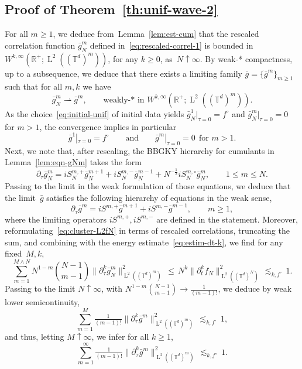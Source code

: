 \documentclass[a4paper,11pt,reqno,noindent]{amsart}
\theoremstyle{plain}
\numberwithin{equation}{section}
\newcommand{\R}{\mathbb R}
\newcommand{\T}{\mathbb T}
\newcommand{\3}{|\!|\!|}
\newcommand{\Ld}{\operatorname{L}}
\newcommand{\cvf}{\rightharpoonup}
\begin{document}
\subsection{Proof of Theorem~\ref{th:unif-wave-2}}
For all $m\ge1$, we deduce from~Lemma~\ref{lem:est-cum} that the rescaled correlation function $\bar g_N^m$ defined in~\eqref{eq:rescaled-correl-1} is bounded in $W^{k,\infty}(\R^+;\Ld^2((\T^d)^m))$, for any $k\ge0$, as~$N\uparrow\infty$.
By weak-* compactness, up to a subsequence, we deduce that there exists a limiting family $\bar g=\{\bar g^m\}_{m\ge1}$ such that for all $m,k$ we have
\[\bar g^m_N\cvf\bar g^m,\qquad\text{weakly-* in $W^{k,\infty}(\R^+;\Ld^2((\T^d)^m))$}.\]
As the choice~\eqref{eq:initial-unif} of initial data yields $\bar g_N^1|_{\tau=0}=f^{\circ}$ and $\bar g_N^m|_{\tau=0}=0$ for $m>1$, the convergence implies in particular
\begin{equation}\label{eq:initial-barg}
\bar g^1|_{\tau=0}=f^{\circ}\qquad\text{and}\qquad\bar g^m|_{\tau=0}=0~~\text{for $m>1$.}
\end{equation}
Next, we note that, after rescaling, the BBGKY hierarchy for cumulants in Lemma~\ref{lem:eqn-gNm} takes the form
\[\partial_\tau\bar g_N^m=iS_N^{m,+}\bar g_N^{m+1}+iS_N^{m,-}\bar g_N^{m-1}+N^{-\frac12}iS_N^{m,\circ}\bar g_N^m,\qquad1\le m\le N.\]
Passing to the limit in the weak formulation of those equations, we deduce that the limit~$\bar g$ satisfies the following hierarchy of equations in the weak sense,
\begin{equation}\label{eq:eqn-barg}
\partial_\tau\bar g^m=iS^{m,+}\bar g^{m+1}+iS^{m,-}\bar g^{m-1},\qquad m\ge1,
\end{equation}
where the limiting operators $iS^{m,+},iS^{m,-}$ are defined in the statement.
Moreover, reformulating~\eqref{eq:cluster-L2fN} in terms of rescaled correlations, truncating the sum, and combining with the energy estimate~\eqref{eq:estim-dt-k}, we find for any fixed~$M,k$,
\[\sum_{m=1}^{M\wedge N}N^{1-m}\binom{N-1}{m-1}\|\partial_\tau^k\bar g_N^m\|_{\Ld^2((\T^d)^m)}^2\,\le \,N^{k}\|\partial_t^kf_N\|_{\Ld^2((\T^d)^N)}^2\,\lesssim_{k,f^\circ}\,1.\]
Passing to the limit $N\uparrow\infty$, with $N^{1-m}\binom{N-1}{m-1}\to\tfrac1{(m-1)!}$, we deduce by weak lower semicontinuity,
\[\sum_{m=1}^{M}\tfrac1{(m-1)!}\|\partial_\tau^k\bar g^m\|_{\Ld^2((\T^d)^m)}^2\,\lesssim_{k,f^\circ}\,1,\]
and thus, letting $M\uparrow\infty$, we infer for all $k\ge1$,
\begin{equation}\label{eq:bnd-barg}
\sum_{m=1}^{\infty}\tfrac1{(m-1)!}\|\partial_\tau^k\bar g^m\|_{\Ld^2((\T^d)^m)}^2\,\lesssim_{k,f^\circ}\,1.
\end{equation}
\end{document}
